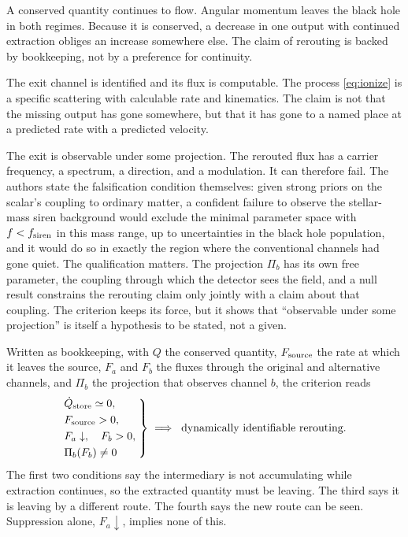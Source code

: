 \documentclass[11pt]{article}
\begin{document}
A conserved quantity continues to flow. Angular momentum leaves the black hole in both regimes. Because it is conserved, a decrease in one output with continued extraction obliges an increase somewhere else. The claim of rerouting is backed by bookkeeping, not by a preference for continuity.

The exit channel is identified and its flux is computable. The process \eqref{eq:ionize} is a specific scattering with calculable rate and kinematics. The claim is not that the missing output has gone somewhere, but that it has gone to a named place at a predicted rate with a predicted velocity.

The exit is observable under some projection. The rerouted flux has a carrier frequency, a spectrum, a direction, and a modulation. It can therefore fail. The authors state the falsification condition themselves: given strong priors on the scalar's coupling to ordinary matter, a confident failure to observe the stellar-mass siren background would exclude the minimal parameter space with $f < f_{\rm siren}$ in this mass range, up to uncertainties in the black hole population, and it would do so in exactly the region where the conventional channels had gone quiet. The qualification matters. The projection $\Pi_b$ has its own free parameter, the coupling through which the detector sees the field, and a null result constrains the rerouting claim only jointly with a claim about that coupling. The criterion keeps its force, but it shows that ``observable under some projection'' is itself a hypothesis to be stated, not a given.

Written as bookkeeping, with $Q$ the conserved quantity, $F_{\rm source}$ the rate at which it leaves the source, $F_a$ and $F_b$ the fluxes through the original and alternative channels, and $\Pi_b$ the projection that observes channel $b$, the criterion reads
\begin{equation}
\left.
\begin{aligned}
&\dot Q_{\rm store} \simeq 0,\\
&F_{\rm source} > 0,\\
&F_a \downarrow, \quad F_b > 0,\\
&\Pi_b(F_b) \neq 0
\end{aligned}
\;\right\}
\;\Longrightarrow\;\; \text{dynamically identifiable rerouting}.
\end{equation}
The first two conditions say the intermediary is not accumulating while extraction continues, so the extracted quantity must be leaving. The third says it is leaving by a different route. The fourth says the new route can be seen. Suppression alone, $F_a \downarrow$, implies none of this.
\end{document}
